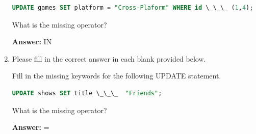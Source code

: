 \documentclass[12pt]{article}
\begin{document}
\begin{enumerate}[1.]
    \begin{lstlisting}[language=SQL]
    UPDATE games SET platform = "Cross-Plaform" WHERE id \_\_\_ (1,4);
    \end{lstlisting}

    \bigskip

    What is the missing operator?

    \bigskip

    \textbf{Answer:} IN


    \item

    Please fill in the correct answer in each blank provided below.

    \bigskip

    Fill in the missing keywords for the following UPDATE statement.

    \bigskip

    \begin{lstlisting}[language=SQL]
    UPDATE shows SET title \_\_\_  "Friends";
    \end{lstlisting}

    \bigskip

    What is the missing operator?

    \bigskip

    \textbf{Answer:} =


\end{enumerate}
\end{document}

